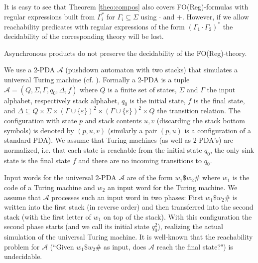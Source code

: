 \documentclass{LMCS}
\renewcommand{\epsilon}{\varepsilon}
\begin{document}
It is easy to see that Theorem \ref{theo:compos} also covers
FO(Reg)-formulas with regular expressions built from 
$\Gamma_i^*$ for $\Gamma_i \subseteq \Sigma$ using $\cdot$ and $+$.
However, if we allow reachability predicates with regular expressions of the 
form $(\Gamma_1 \cdot \Gamma_2)^*$ the decidability of the corresponding 
theory will be lost.












\begin{thm}
  Asynchronous products do not preserve the decidability of the 
 FO(Reg)-theory.
\end{thm}

\proof
We use a 2-PDA $\mathcal  A$ (pushdown automaton 
with two stacks) that simulates 
a universal Turing machine (cf. \cite{hu79}). 
Formally a 2-PDA is a tuple 
$\mathcal A=(Q, \Sigma, \Gamma, q_0, \Delta, f)$
where $Q$ is a finite set of states, $\Sigma$ and $\Gamma$ the input alphabet,
respectively  stack alphabet, 
$q_0$ is the initial state, $f$ is the final state, and 
$\Delta \subseteq Q \times \Sigma \times (\Gamma \cup \{\epsilon\})^2 \times (\Gamma \cup \{\epsilon\})^2 \times Q$ the transition relation. The configuration with 
state $p$ and stack contents $u,v$ (discarding the stack bottom symbols) 
is denoted by $(p,u,v)$ (similarly a pair
$(p,u)$ is a configuration of a standard PDA).  
We assume that Turing 
machines (as well as 2-PDA's) are normalized, i.e. that each state 
is reachable from the 
initial state $q_0$, the only sink state is the final state $f$ and there
are no incoming transitions to $q_0$. 

Input words for the universal 2-PDA $\mathcal A$ are  
of the form $w_1\$w_2\#$ where $w_1$ is the code 
of a Turing machine and $w_2$ an input word for the Turing machine. We 
assume that $\mathcal A$ processes such an input word in two phases: 
First $w_1\$w_2\#$ is written into the first stack 
(in reverse order) and then transferred into the second stack (with the 
first letter of $w_1$ on top of the stack). With this configuration 
the second phase starts (and we call its initial state $q_0^2$), 
realizing the actual simulation of the universal 
Turing machine. It is well-known that the reachability problem for 
$\mathcal A$ (``Given $w_1\$w_2\#$ as input, 
does $\mathcal A$ reach the final state?") is undecidable. 
\end{document}
